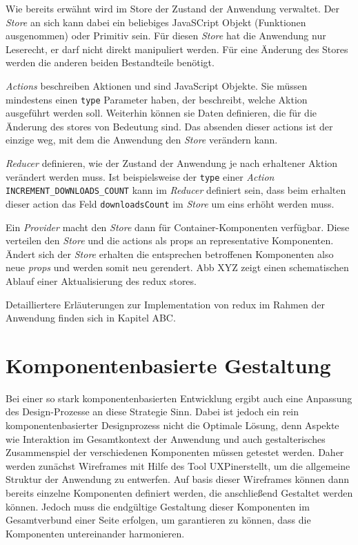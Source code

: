 
Wie bereits erwähnt wird im Store der Zustand der Anwendung verwaltet. Der \textit{Store} an sich kann dabei ein beliebiges JavaSCript Objekt (Funktionen ausgenommen) oder Primitiv sein. Für diesen \textit{Store} hat die Anwendung nur Leserecht, er darf nicht direkt manipuliert werden. Für eine Änderung des Stores werden die anderen beiden Bestandteile benötigt.

\textit{Actions} beschreiben Aktionen und sind JavaScript Objekte. Sie müssen mindestens einen \verb|type| Parameter haben, der beschreibt, welche Aktion ausgeführt werden soll. Weiterhin können sie Daten definieren, die für die Änderung des stores von Bedeutung sind. Das absenden dieser actions ist der einzige weg, mit dem die Anwendung den \textit{Store} verändern kann.

\textit{Reducer} definieren, wie der Zustand der Anwendung je nach erhaltener Aktion verändert werden muss. Ist beispielsweise der \verb|type| einer \textit{Action} \verb|INCREMENT_DOWNLOADS_COUNT| kann im \textit{Reducer} definiert sein, dass beim erhalten dieser action das Feld \verb|downloadsCount| im \textit{Store} um eins erhöht werden muss.

Ein \textit{Provider} macht den \textit{Store} dann für Container-Komponenten verfügbar. Diese verteilen den \textit{Store} und die actions als props an representative Komponenten. Ändert sich der \textit{Store} erhalten die entsprechen betroffenen Komponenten also neue \textit{props} und werden somit neu gerendert.
Abb XYZ zeigt einen schematischen Ablauf einer Aktualisierung des redux stores.

Detailliertere Erläuterungen zur Implementation von redux im Rahmen der Anwendung finden sich in Kapitel ABC.

\section{Komponentenbasierte Gestaltung}
Bei einer so stark komponentenbasierten Entwicklung ergibt auch eine Anpassung des Design-Prozesse an diese Strategie Sinn. Dabei ist jedoch ein rein komponentenbasierter Designprozess nicht die Optimale Lösung, denn Aspekte wie Interaktion im Gesamtkontext der Anwendung und auch gestalterisches Zusammenspiel der verschiedenen Komponenten müssen getestet werden.
Daher werden zunächst Wireframes mit Hilfe des Tool UXPin\footnotemark erstellt, um die allgemeine Struktur der Anwendung zu entwerfen. Auf basis dieser Wireframes können dann bereits einzelne Komponenten definiert werden, die anschließend Gestaltet werden können. Jedoch muss die endgültige Gestaltung dieser Komponenten im Gesamtverbund einer Seite erfolgen, um garantieren zu können, dass die Komponenten untereinander harmonieren.

